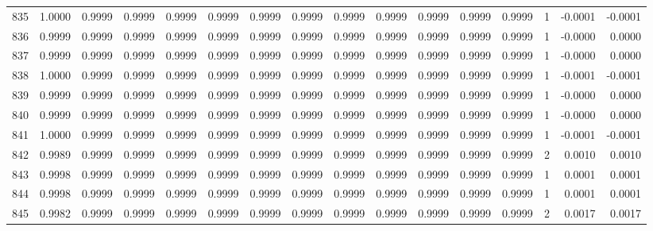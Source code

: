 \begin{tabular}{lrrrrrrrrrrrrrrr}
835 &      1.0000 &  0.9999 &  0.9999 &  0.9999 &  0.9999 &  0.9999 &  0.9999 &  0.9999 &  0.9999 &  0.9999 &   0.9999 &     0.9999 &      1 &                   -0.0001 &                    -0.0001 \\
836 &      0.9999 &  0.9999 &  0.9999 &  0.9999 &  0.9999 &  0.9999 &  0.9999 &  0.9999 &  0.9999 &  0.9999 &   0.9999 &     0.9999 &      1 &                   -0.0000 &                     0.0000 \\
837 &      0.9999 &  0.9999 &  0.9999 &  0.9999 &  0.9999 &  0.9999 &  0.9999 &  0.9999 &  0.9999 &  0.9999 &   0.9999 &     0.9999 &      1 &                   -0.0000 &                     0.0000 \\
838 &      1.0000 &  0.9999 &  0.9999 &  0.9999 &  0.9999 &  0.9999 &  0.9999 &  0.9999 &  0.9999 &  0.9999 &   0.9999 &     0.9999 &      1 &                   -0.0001 &                    -0.0001 \\
839 &      0.9999 &  0.9999 &  0.9999 &  0.9999 &  0.9999 &  0.9999 &  0.9999 &  0.9999 &  0.9999 &  0.9999 &   0.9999 &     0.9999 &      1 &                   -0.0000 &                     0.0000 \\
840 &      0.9999 &  0.9999 &  0.9999 &  0.9999 &  0.9999 &  0.9999 &  0.9999 &  0.9999 &  0.9999 &  0.9999 &   0.9999 &     0.9999 &      1 &                   -0.0000 &                     0.0000 \\
841 &      1.0000 &  0.9999 &  0.9999 &  0.9999 &  0.9999 &  0.9999 &  0.9999 &  0.9999 &  0.9999 &  0.9999 &   0.9999 &     0.9999 &      1 &                   -0.0001 &                    -0.0001 \\
842 &      0.9989 &  0.9999 &  0.9999 &  0.9999 &  0.9999 &  0.9999 &  0.9999 &  0.9999 &  0.9999 &  0.9999 &   0.9999 &     0.9999 &      2 &                    0.0010 &                     0.0010 \\
843 &      0.9998 &  0.9999 &  0.9999 &  0.9999 &  0.9999 &  0.9999 &  0.9999 &  0.9999 &  0.9999 &  0.9999 &   0.9999 &     0.9999 &      1 &                    0.0001 &                     0.0001 \\
844 &      0.9998 &  0.9999 &  0.9999 &  0.9999 &  0.9999 &  0.9999 &  0.9999 &  0.9999 &  0.9999 &  0.9999 &   0.9999 &     0.9999 &      1 &                    0.0001 &                     0.0001 \\
845 &      0.9982 &  0.9999 &  0.9999 &  0.9999 &  0.9999 &  0.9999 &  0.9999 &  0.9999 &  0.9999 &  0.9999 &   0.9999 &     0.9999 &      2 &                    0.0017 &                     0.0017 \\

\end{tabular}
